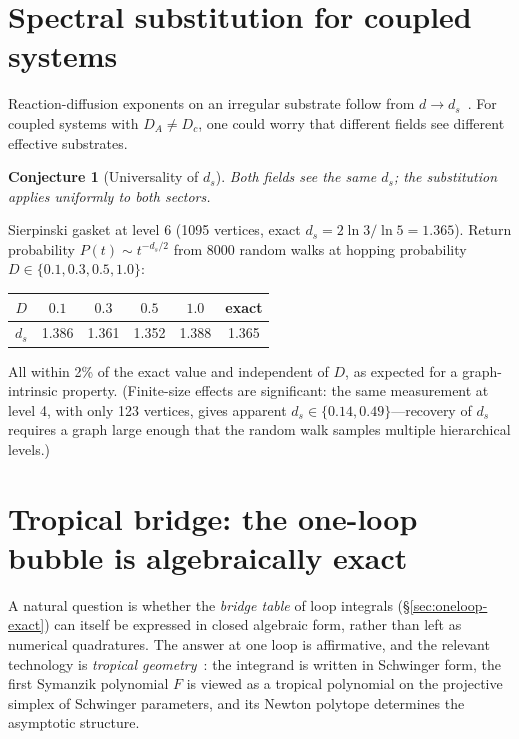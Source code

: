 \documentclass[11pt,a4paper]{article}
\theoremstyle{plain}
\newtheorem{conjecture}[theorem]{Conjecture}
\begin{document}
\section{Spectral substitution for coupled systems}
\label{sec:spectral}

Reaction-diffusion exponents on an irregular substrate follow
from $d \to d_s$~\cite{AlexanderOrbach,Havlin,Hattori}.  For
coupled systems with $D_A \neq D_c$, one could worry that
different fields see different effective substrates.

\begin{conjecture}[Universality of $d_s$]
\label{conj:ds}
Both fields see the same $d_s$; the substitution applies
uniformly to both sectors.
\end{conjecture}

Sierpinski gasket at level 6 (1095 vertices, exact
$d_s = 2\ln 3/\ln 5 = 1.365$).  Return probability
$P(t) \sim t^{-d_s/2}$ from 8000 random walks at hopping
probability $D \in \{0.1, 0.3, 0.5, 1.0\}$:
\begin{center}\small
\begin{tabular}{@{}cccccc@{}}\toprule
$D$ & $0.1$ & $0.3$ & $0.5$ & $1.0$ & exact \\ \midrule
$d_s$ & 1.386 & 1.361 & 1.352 & 1.388 & 1.365 \\ \bottomrule
\end{tabular}
\end{center}
All within 2\% of the exact value and independent of $D$, as
expected for a graph-intrinsic property.  (Finite-size effects
are significant: the same measurement at level 4, with only 123
vertices, gives apparent $d_s \in \{0.14, 0.49\}$---recovery of
$d_s$ requires a graph large enough that the random walk samples
multiple hierarchical levels.)

\section{Tropical bridge: the one-loop bubble is algebraically exact}
\label{sec:tropical}

A natural question is whether the \emph{bridge table} of loop
integrals (\S\ref{sec:oneloop-exact}) can itself be expressed in
closed algebraic form, rather than left as numerical
quadratures.  The answer at one loop is affirmative, and the
relevant technology is \emph{tropical
geometry}~\cite{Borinsky2020,Borinsky2025,AHHSalvatori2022}:
the integrand is written in Schwinger form, the first Symanzik
polynomial $F$ is viewed as a tropical polynomial on the
projective simplex of Schwinger parameters, and its Newton
polytope determines the asymptotic structure.
\end{document}
